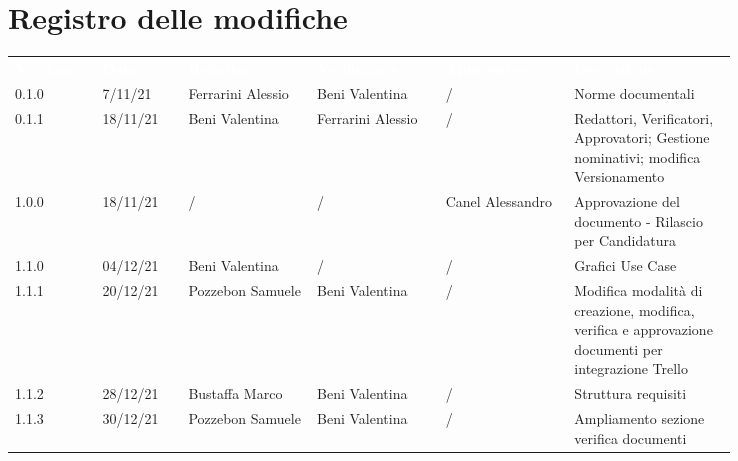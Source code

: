 \section*{Registro delle modifiche}

{\renewcommand{\arraystretch}{1.5}
\scriptsize
\begin{tabular}{p{0.10\linewidth}p{0.10\linewidth}p{0.15\linewidth}p{0.15\linewidth}p{0.15\linewidth}p{0.19\linewidth}}
	\rowcolor[RGB]{33, 73, 50}
	\textcolor{white}{\textbf{Versione}} & \textcolor{white}{\textbf{Data}} & \textcolor{white}
	{\textbf{Redattore}} & \textcolor{white}{\textbf{Verificatore}} & \textcolor{white}{\textbf{Approvatore}} & \textcolor{white}
	{\textbf{Descrizione}}\\
	\rowcolor[RGB]{216, 235, 171}
	0.1.0 & 7/11/21 & Ferrarini Alessio & Beni Valentina & / & Norme documentali\\
	\rowcolor[RGB]{233, 245, 206}
	0.1.1 & 18/11/21 & Beni Valentina & Ferrarini Alessio & / & Redattori, Verificatori, Approvatori; Gestione nominativi; modifica Versionamento\\
	\rowcolor[RGB]{216, 235, 171}
	1.0.0 & 18/11/21 & / & / & Canel Alessandro & Approvazione del documento - Rilascio per Candidatura\\
	\rowcolor[RGB]{233, 245, 206}
	1.1.0 & 04/12/21 & Beni Valentina & / & / & Grafici Use Case \\
	\rowcolor[RGB]{216, 235, 171}
	1.1.1 & 20/12/21 & Pozzebon Samuele & Beni Valentina & / & Modifica modalità di	creazione, modifica, verifica e approvazione documenti per integrazione Trello\\
	\rowcolor[RGB]{233, 245, 206}
	1.1.2 & 28/12/21 & Bustaffa Marco & Beni Valentina & / & Struttura requisiti\\
	\rowcolor[RGB]{216, 235, 171}
	1.1.3 & 30/12/21 & Pozzebon Samuele & Beni Valentina & / & Ampliamento sezione verifica documenti
\end{tabular}	
}